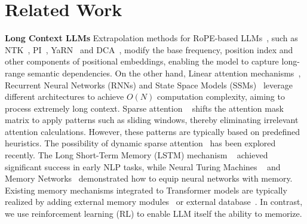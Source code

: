 \section{Related Work}

\textbf{Long Context LLMs} Extrapolation methods for RoPE-based LLMs~\cite{su2024roformer}, such as NTK~\cite{blocntkaware}, PI~\cite{chen2023extending}, YaRN~\cite{peng2023yarn} and DCA~\cite{an2024training}, modify the base frequency, position index and other components of positional embeddings, enabling the model to capture long-range semantic dependencies. On the other hand, Linear attention mechanisms~\cite{child2019generating, katharopoulos2020transformers}, Recurrent Neural Networks (RNNs) and State Space Models (SSMs)~\cite{gu2021efficiently, gu2023mamba, peng2023rwkv, de2024griffin, feng2024attention} leverage different architectures to achieve $O(N)$ computation complexity, aiming to process extremely long context. Sparse attention ~\cite{beltagy2020longformer, zhao2019explicit, xiao2023efficient} shifts the attention mask matrix to apply patterns such as sliding windows, thereby eliminating irrelevant attention calculations. However, these patterns are typically based on predefined heuristics. The possibility of dynamic sparse attention~\cite{yuan2025native,lu2025moba} has been explored recently. The Long Short-Term Memory (LSTM) mechanism ~\cite{hochreiter1997long} achieved significant success in early NLP tasks, while Neural Turing Machines ~\cite{graves2014neural} and Memory Networks~\cite{weston2014memory} demonstrated how to equip neural networks with memory. Existing memory mechanisms integrated to Transformer models are typically realized by adding external memory modules~\cite{martins2021infty,wu2020memformer, behrouz2024titans, bulatov2023scaling} or external database~\cite{zhong2024memorybank, lu2023memochat, modarressi2023ret}. In contrast, we use reinforcement learning (RL) to enable LLM itself the ability to memorize.


